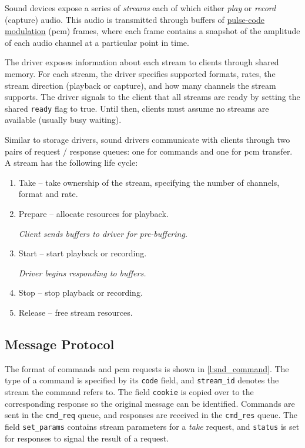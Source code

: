 \documentclass[a4paper,12pt]{report}
\newcommand{\code}[1]{\texttt{#1}}
\begin{document}
Sound devices expose a series of \textit{streams} each of which either
\textit{play} or \textit{record} (capture) audio. This audio is transmitted
through buffers of
\href{https://en.wikipedia.org/wiki/Pulse-code_modulation}{pulse-code
  modulation} (\gls{pcm}) frames, where
each frame contains a snapshot of the amplitude of each audio channel at a
particular point in time.

The driver exposes information about each stream to clients through shared
memory. For each stream, the driver specifies supported formats, rates, the
stream direction (playback or capture), and how many channels the stream
supports. The driver signals to the client that all streams are ready by setting
the shared \code{ready} flag to true. Until then, clients must assume no
streams are available (usually busy waiting).

Similar to storage drivers, sound drivers communicate with clients through two
pairs of request / response queues: one for commands and one for \gls{pcm} transfer.
A stream has the following life cycle:
\begin{enumerate}
  \item Take -- take ownership of the stream, specifying the number of channels, format and rate.
  \item Prepare -- allocate resources for playback.

  \textit{Client sends buffers to driver for pre-buffering.}

  \item Start -- start playback or recording.

  \textit{Driver begins responding to buffers.}

  \item Stop -- stop playback or recording.
  \item Release -- free stream resources.
\end{enumerate}

\subsection{Message Protocol}

The format of commands and \gls{pcm} requests is shown in \autoref{l:snd_command}.
The type of a command is specified by its \code{code} field, and
\code{stream\_id} denotes the stream the command refers to. The field
\code{cookie} is copied over to the corresponding response so the original
message can be identified. Commands are sent in the \code{cmd\_req} queue, and
responses are received in the \code{cmd\_res} queue.  The field \code{set\_params}
contains stream parameters for a \textit{take} request, and \code{status} is set
for responses to signal the result of a request.
\end{document}
